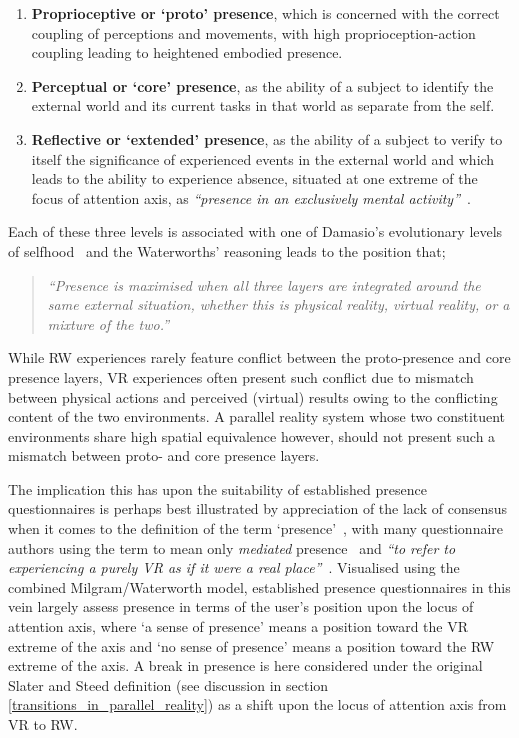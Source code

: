 \begin{enumerate}

\item \textbf{Proprioceptive or `proto' presence}, which is concerned with the correct coupling of perceptions and movements, with high proprioception-action coupling leading to heightened embodied presence.

\item \textbf{Perceptual or `core' presence}, as the ability of a subject to identify the external world and its current tasks in that world as separate from the self.

\item \textbf{Reflective or `extended' presence}, as the ability of a subject to verify to itself the significance of experienced events in the external world and which leads to the ability to experience absence, situated at one extreme of the focus of attention axis, as \textit{``presence in an exclusively mental activity''}~\cite{Giuseppe2014}.

\end{enumerate}

Each of these three levels is associated with one of Damasio's evolutionary levels of selfhood~\cite{Damasio1999} and the Waterworths' reasoning leads to the position that;

\begin{quote}
\textit{``Presence is maximised when all three layers are integrated around the same external situation, whether this is physical reality, virtual reality, or a mixture of the two.''}~\cite{Mantovani2010}
\end{quote}

While RW experiences rarely feature conflict between the proto-presence and core presence layers, VR experiences often present such conflict due to mismatch between physical actions and perceived (virtual) results owing to the conflicting content of the two environments. A parallel reality system whose two constituent environments share high spatial equivalence however, should not present such a mismatch between proto- and core presence layers.

The implication this has upon the suitability of established presence questionnaires is perhaps best illustrated by appreciation of the lack of consensus when it comes to the definition of the term `presence'~\cite{Calleja2014}, with many questionnaire authors using the term to mean only \textit{mediated} presence~\cite{Mantovani2010} and \textit{``to refer to experiencing a purely VR as if it were a real place''}~\cite{Steed2014}. Visualised using the combined Milgram/Waterworth model, established presence questionnaires in this vein largely assess presence in terms of the user's position upon the locus of attention axis, where `a sense of presence' means a position toward the VR extreme of the axis and `no sense of presence' means a position toward the RW extreme of the axis. A break in presence is here considered under the original Slater and Steed definition (see discussion in section \ref{transitions_in_parallel_reality}) as a shift upon the locus of attention axis from VR to RW.

